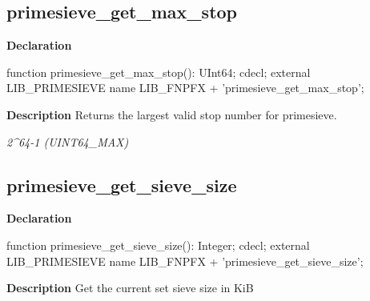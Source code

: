 \documentclass{report}
\newif\ifpdf
\begin{document}
\subsection*{primesieve{\_}get{\_}max{\_}stop}
\fi
\label{primesieve-primesieve_get_max_stop}
\begin{list}{}{
\setlength{\itemindent}{0cm}
\setlength{\listparindent}{0cm}
\setlength{\leftmargin}{\evensidemargin}
\addtolength{\leftmargin}{\tmplength}
\settowidth{\labelsep}{X}
\addtolength{\leftmargin}{\labelsep}
\setlength{\labelwidth}{\tmplength}
}
\item[\textbf{Declaration}\hfill]
\ifpdf
\begin{flushleft}
\fi
\begin{ttfamily}
function primesieve{\_}get{\_}max{\_}stop(): UInt64; cdecl; external LIB{\_}PRIMESIEVE name LIB{\_}FNPFX + 'primesieve{\_}get{\_}max{\_}stop';\end{ttfamily}

\ifpdf
\end{flushleft}
\fi

\par
\item[\textbf{Description}]
Returns the largest valid stop number for primesieve.

\textit{2{\^{}}64{-}1 (UINT64{\_}MAX)}

\end{list}
\ifpdf
\subsection*{\large{\textbf{primesieve{\_}get{\_}sieve{\_}size}}\normalsize\hspace{1ex}\hrulefill}
\else
\subsection*{primesieve{\_}get{\_}sieve{\_}size}
\fi
\label{primesieve-primesieve_get_sieve_size}
\begin{list}{}{
\setlength{\itemindent}{0cm}
\setlength{\listparindent}{0cm}
\setlength{\leftmargin}{\evensidemargin}
\addtolength{\leftmargin}{\tmplength}
\settowidth{\labelsep}{X}
\addtolength{\leftmargin}{\labelsep}
\setlength{\labelwidth}{\tmplength}
}
\item[\textbf{Declaration}\hfill]
\ifpdf
\begin{flushleft}
\fi
\begin{ttfamily}
function primesieve{\_}get{\_}sieve{\_}size(): Integer; cdecl; external LIB{\_}PRIMESIEVE name LIB{\_}FNPFX + 'primesieve{\_}get{\_}sieve{\_}size';\end{ttfamily}

\ifpdf
\end{flushleft}
\fi

\par
\item[\textbf{Description}]
Get the current set sieve size in KiB

\end{list}
\ifpdf
\end{document}
